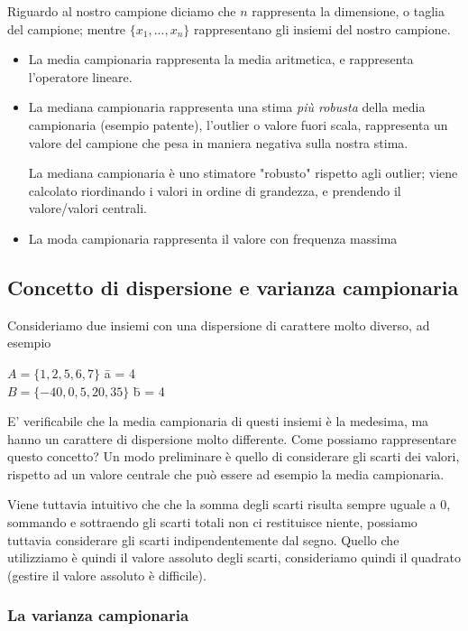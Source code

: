 Riguardo al nostro campione diciamo che $n$ rappresenta la dimensione, o taglia del campione; mentre ${\{x_1, ..., x_n\}}$ rappresentano gli insiemi del nostro campione.
\begin{itemize}
\item La media campionaria rappresenta la media aritmetica, e rappresenta l'operatore lineare. %
\item La mediana campionaria rappresenta una stima \emph{più robusta} della media campionaria (esempio patente), l'outlier o valore fuori scala, rappresenta un valore del campione che pesa in maniera negativa sulla nostra stima. 

La mediana campionaria è uno stimatore "robusto" rispetto agli outlier; viene calcolato riordinando i valori in ordine di grandezza, e prendendo il valore/valori centrali. %
\item La moda campionaria rappresenta il valore con frequenza massima
\end{itemize}

\subsection{Concetto di dispersione e varianza campionaria}
Consideriamo due insiemi con una dispersione di carattere molto diverso, ad esempio\begin{center}
$A = \{1, 2, 5, 6, 7\}$ \quad \={a}  = 4\\
$B = \{-40, 0, 5, 20, 35\}$ \quad \={b}  = 4\\
\end{center}
E' verificabile che la media campionaria di questi insiemi è la medesima, ma hanno un carattere di dispersione molto differente. Come possiamo rappresentare questo concetto? 
Un modo preliminare è quello di considerare gli scarti dei valori, rispetto ad un valore centrale che può essere ad esempio la media campionaria. 

Viene tuttavia intuitivo che che la somma degli scarti risulta sempre uguale a 0, sommando e sottraendo gli scarti totali non ci restituisce niente, possiamo tuttavia considerare gli scarti indipendentemente dal segno. Quello che utilizziamo è quindi il valore assoluto degli scarti, consideriamo quindi il quadrato (gestire il valore assoluto è difficile).

\subsubsection{La varianza campionaria}

